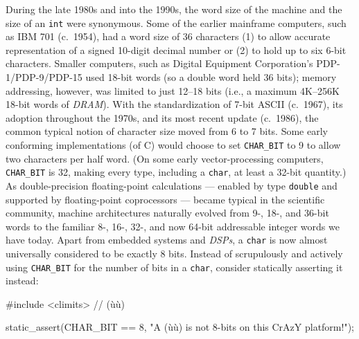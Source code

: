 During the late 1980s and into the 1990s, the word size of the machine and
the size of an \lstinline!int! were synonymous. Some of
the earlier mainframe computers, such as IBM 701 (c.~1954), had a word
size of 36 characters (1) to allow accurate representation of a signed
10-digit decimal number or (2) to hold up to six 6-bit characters.
Smaller computers, such as Digital Equipment Corporation's
PDP-1/PDP-9/PDP-15 used 18-bit words (so a double word held 36 bits);
memory addressing, however, was limited to just 12--18 bits (i.e., a
maximum 4K--256K 18-bit words of \emph{DRAM}). With the standardization
of 7-bit ASCII (c.~1967), its adoption throughout the 1970s, and its most
recent update (c.~1986), the common typical notion of character size
moved from 6 to 7 bits. Some early conforming implementations (of C)
would choose to set \lstinline!CHAR_BIT! to 9 to allow two characters
per half word. (On some early vector-processing computers,
\lstinline!CHAR_BIT! is 32, making every type, including a
\lstinline!char!, at least a 32-bit quantity.) As double-precision floating-point calculations --- enabled by type \lstinline!double! and supported by floating-point coprocessors --- became typical in the scientific community, machine architectures
naturally evolved from 9-, 18-, and 36-bit words to the familiar 8-,
16-, 32-, and now 64-bit addressable integer words we have today.
Apart from embedded systems and \emph{DSPs}, a \lstinline!char! is now
almost universally considered to be exactly 8 bits. Instead of
scrupulously and actively using \lstinline!CHAR_BIT! for the number of bits
in a \lstinline!char!, consider statically asserting it instead:

\begin{emcppshiddenlisting}[emcppsbatch=e7]
#include <climits>  // (ù{}ù)
\end{emcppshiddenlisting}
\begin{emcppslisting}[emcppsbatch=e7]
static_assert(CHAR_BIT == 8, "A (ù{}ù) is not 8-bits on this CrAzY platform!");
\end{emcppslisting}

